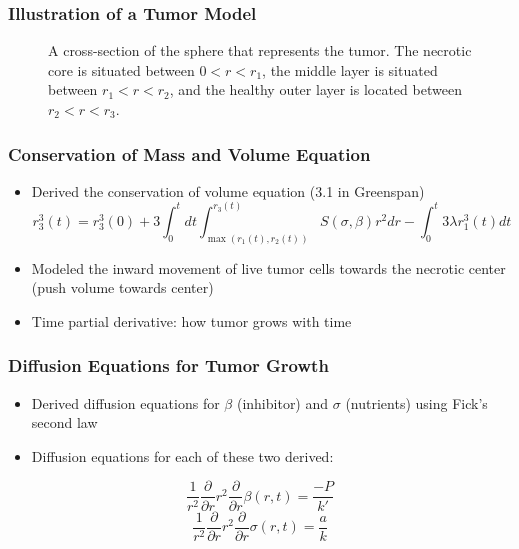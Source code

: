 \documentclass{beamer}
\begin{document}
\begin{frame}
  \frametitle{Illustration of a Tumor Model}
  \begin{figure}[ht]
    \centering
    \caption{A cross-section of the sphere that represents the tumor. The necrotic core is situated between $0 < r < r_1$,
        the middle layer is situated between $r_1 < r < r_2$, and the healthy outer layer is located between $r_2 < r < r_3$.}
    \label{fig:cross-section}
\end{figure}

\end{frame}


\begin{frame}
  \frametitle{Conservation of Mass and Volume Equation}
  \begin{itemize}
    \item Derived the conservation of volume equation (3.1 in Greenspan) 
    \begin{equation}
      r_3^3(t) = r_3^3(0) + 3\int_{0}^{t} dt \int_{\max(r_1(t), r_2(t))}^{r_3(t)} S(\sigma, \beta) r^2 dr
      - \int_{0}^{t}3\lambda r_1^3(t) dt
  \end{equation}
    \item Modeled the inward movement of live tumor cells towards the necrotic center (push volume towards center)
    \item Time partial derivative: how tumor grows with time
  \end{itemize}
\end{frame}

\begin{frame}
  \frametitle{Diffusion Equations for Tumor Growth}
  \begin{itemize}
    \item Derived diffusion equations for $\beta$ (inhibitor) and $\sigma$ (nutrients) using Fick's second law
    \item Diffusion equations for each of these two derived:
  \end{itemize}
  \begin{equation}
    \frac{1}{r^2} \frac{\partial}{\partial r} r^2 \frac{\partial}{\partial r} \beta(r, t) = \frac{-P}{k'}
  \end{equation}
  \begin{equation}
    \frac{1}{r^2} \frac{\partial}{\partial r} r^2 \frac{\partial}{\partial r} \sigma(r, t) = \frac{a}{k}
\end{equation}
\end{frame}
\end{document}
